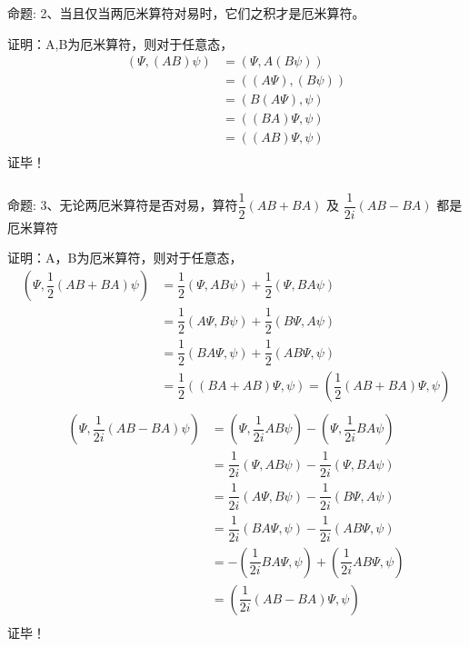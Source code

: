 \begin{frame} [allowframebreaks=]
    \frametitle{}
    \begin{tcolorbox1}{命题:}
        2、当且仅当两厄米算符对易时，它们之积才是厄米算符。
    \end{tcolorbox1}
    \alert{证明：}A,B为厄米算符，则对于任意态，
    \begin{equation*}
        \begin{split}
            (\Psi, (AB)\psi ) &= (\Psi, A(B\psi) ) \\  
            &=((A \Psi), (B\psi) )  \\
            &=(B(A \Psi), \psi )  \\
            &=( (BA) \Psi, \psi )  \\
            &=( (AB) \Psi, \psi )  \\
         \end{split}
    \end{equation*}  
    证毕！
\end{frame}  

\begin{frame} [allowframebreaks=]
    \frametitle{}
    \begin{tcolorbox1}{命题:}
        3、无论两厄米算符是否对易，算符$\dfrac{1}{2}(AB+BA)$ 及 $\dfrac{1}{2i}(AB-BA) $ 都是厄米算符
    \end{tcolorbox1}
    \alert{证明：}A，B为厄米算符，则对于任意态，
    \begin{equation*}
        \begin{split}
            (\Psi, \dfrac{1}{2}(AB+BA)\psi ) &=\dfrac{1}{2}(\Psi, AB\psi) + \dfrac{1}{2}(\Psi, BA\psi)  \\
            &=\dfrac{1}{2}(A\Psi, B\psi) + \dfrac{1}{2}(B\Psi, A\psi)  \\
            &=\dfrac{1}{2}(BA\Psi, \psi) + \dfrac{1}{2}(AB\Psi, \psi)  \\
            &=\dfrac{1}{2}((BA+AB)\Psi, \psi) =(\dfrac{1}{2}(AB+BA)\Psi, \psi)\\
         \end{split}
    \end{equation*}  
    \begin{equation*}
        \begin{split}
            (\Psi, \dfrac{1}{2i}(AB-BA)\psi ) &= (\Psi, \dfrac{1}{2i}AB\psi) - (\Psi, \dfrac{1}{2i}BA\psi)\\  
            &=\dfrac{1}{2i}(\Psi, AB\psi) - \dfrac{1}{2i}(\Psi, BA\psi)  \\
            &=\dfrac{1}{2i}(A\Psi, B\psi) - \dfrac{1}{2i}(B\Psi, A\psi)  \\
            &=\dfrac{1}{2i}(BA\Psi, \psi) - \dfrac{1}{2i}(AB\Psi, \psi)  \\
            &=-(\dfrac{1}{2i}BA\Psi, \psi) +(\dfrac{1}{2i}AB\Psi, \psi)  \\
            &=(\dfrac{1}{2i}(AB-BA)\Psi, \psi) \\
         \end{split}
    \end{equation*}  
    证毕！
\end{frame}  

